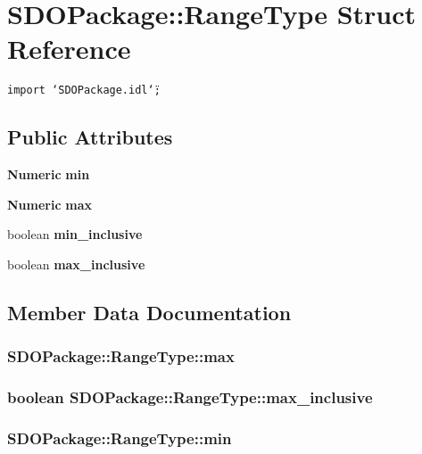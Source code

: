 \section{SDOPackage::Range\-Type Struct Reference}
\label{structSDOPackage_1_1RangeType}
{\tt import \char`\"{}SDOPackage.idl\char`\"{};}

\subsection*{Public Attributes}
\begin{CompactItemize}
\item 
{\bf Numeric} {\bf min}
\item 
{\bf Numeric} {\bf max}
\item 
boolean {\bf min\_\-inclusive}
\item 
boolean {\bf max\_\-inclusive}
\end{CompactItemize}


\subsection{Member Data Documentation}
\subsubsection{ {\bf SDOPackage::Range\-Type::max}}\label{structSDOPackage_1_1RangeType_SDOPackage_1_1RangeTypeo1}


\subsubsection{\setlength{\rightskip}{0pt plus 5cm}boolean {\bf SDOPackage::Range\-Type::max\_\-inclusive}}\label{structSDOPackage_1_1RangeType_SDOPackage_1_1RangeTypeo3}


\subsubsection{ {\bf SDOPackage::Range\-Type::min}}\label{structSDOPackage_1_1RangeType_SDOPackage_1_1RangeTypeo0}


